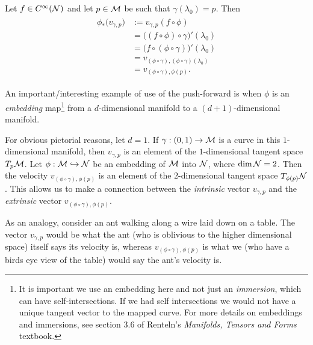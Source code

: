 \documentclass[12pt]{article} %
\begin{document}
\bq 
    Let $f\in C^{\infty}(\mathcal{N})$ and let $p\in\mathcal{M}$ be such that $\gamma(\lambda_0)=p$. Then 
    \begin{align*} 
        \begin{split}
            \phi_*\big(v_{\gamma,p}\big) & := v_{\gamma,p}(f\circ \phi) \\
            & = \big( (f\circ \phi) \circ \gamma\big)'(\lambda_0) \\
            & = \big( f\circ (\phi \circ \gamma)\big)'(\lambda_0) \\
            & = v_{(\phi\circ\gamma),(\phi\circ\gamma)(\lambda_0)} \\
            & = v_{(\phi\circ\gamma),\phi(p)}.
        \end{split}
    \end{align*} 
\eq 

\bex 
    An important/interesting example of use of the push-forward is when $\phi$ is an \textit{embedding} map\footnote{It is important we use an embedding here and not just an \textit{immersion}, which can have self-intersections. If we had self intersections we would not have a unique tangent vector to the mapped curve. For more details on embeddings and immersions, see section 3.6 of Renteln's \textit{Manifolds, Tensors and Forms} textbook.} from a $d$-dimensional manifold to a $(d+1)$-dimensional manifold. 
    
    For obvious pictorial reasons, let $d=1$. If $\gamma:(0,1)\to\mathcal{M}$ is a curve in this $1$-dimensional manifold, then $v_{\gamma,p}$ is an element of the $1$-dimensional tangent space $T_p\mathcal{M}$. Let $\phi:\mathcal{M}\hookrightarrow\mathcal{N}$ be an embedding of $\mathcal{M}$ into $\mathcal{N}$, where $\dim\mathcal{N}=2$. Then the velocity $v_{(\phi\circ\gamma),\phi(p)}$ is an element of the $2$-dimensional tangent space $T_{\phi(p)}\mathcal{N}$. This allows us to make a connection between the \textit{intrinsic} vector $v_{\gamma,p}$ and the \textit{extrinsic} vector $v_{(\phi\circ\gamma),\phi(p)}$. 
    
    As an analogy, consider an ant walking along a wire laid down on a table. The vector $v_{\gamma,p}$ would be what the ant (who is oblivious to the higher dimensional space) itself says its velocity is, whereas $v_{(\phi\circ\gamma),\phi(p)}$ is what we (who have a birds eye view of the table) would say the ant's velocity is. 
    
\end{document}
